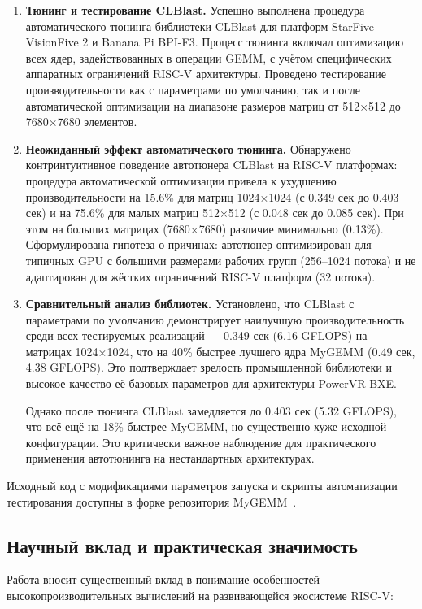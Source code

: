 \begin{enumerate}
    \item \textbf{Тюнинг и тестирование CLBlast.} Успешно выполнена процедура автоматического тюнинга библиотеки CLBlast для платформ StarFive VisionFive 2 и Banana Pi BPI-F3. Процесс тюнинга включал оптимизацию всех ядер, задействованных в операции GEMM, с учётом специфических аппаратных ограничений RISC-V архитектуры. Проведено тестирование производительности как с параметрами по умолчанию, так и после автоматической оптимизации на диапазоне размеров матриц от 512×512 до 7680×7680 элементов.
    
    \item \textbf{Неожиданный эффект автоматического тюнинга.} Обнаружено контринтуитивное поведение автотюнера CLBlast на RISC-V платформах: процедура автоматической оптимизации привела к ухудшению производительности на 15.6\% для матриц 1024×1024 (с 0.349 сек до 0.403 сек) и на 75.6\% для малых матриц 512×512 (с 0.048 сек до 0.085 сек). При этом на больших матрицах (7680×7680) различие минимально (0.13\%). Сформулирована гипотеза о причинах: автотюнер оптимизирован для типичных GPU с большими размерами рабочих групп (256--1024 потока) и не адаптирован для жёстких ограничений RISC-V платформ (32 потока).

    \item \textbf{Сравнительный анализ библиотек.} Установлено, что CLBlast с параметрами по умолчанию демонстрирует наилучшую производительность среди всех тестируемых реализаций --- 0.349 сек (6.16 GFLOPS) на матрицах 1024×1024, что на 40\% быстрее лучшего ядра MyGEMM (0.49 сек, 4.38 GFLOPS). Это подтверждает зрелость промышленной библиотеки и высокое качество её базовых параметров для архитектуры PowerVR BXE.
    
    Однако после тюнинга CLBlast замедляется до 0.403 сек (5.32 GFLOPS), что всё ещё на 18\% быстрее MyGEMM, но существенно хуже исходной конфигурации. Это критически важное наблюдение для практического применения автотюнинга на нестандартных архитектурах.
\end{enumerate}

Исходный код с модификациями параметров запуска и скрипты автоматизации тестирования доступны в форке репозитория MyGEMM~\cite{mygemm_repo_test}.

\subsection*{Научный вклад и практическая значимость}

Работа вносит существенный вклад в понимание особенностей высокопроизводительных вычислений на развивающейся экосистеме RISC-V:

